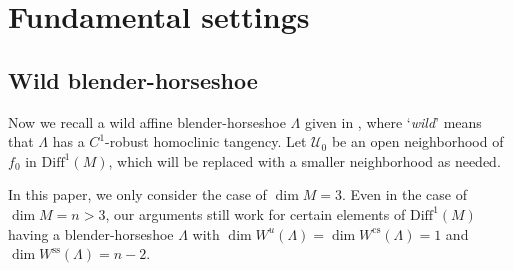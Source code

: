\documentclass{amsart}
\theoremstyle{plain}
\theoremstyle{definition}
\numberwithin{equation}{section}
\numberwithin{figure}{section}
\def\cs{{\mathrm{cs}}}
\def\diff{\mathrm{Diff}}
\begin{document}
\section{Fundamental settings}

\subsection{Wild blender-horseshoe}


Now we recall a wild affine blender-horseshoe $\Lambda$ given in \cite{KNS23,KNS}, 
where `\emph{wild}' means that $\Lambda$ has a $C^1$-robust homoclinic tangency.
Let $\mathcal{U}_0$ be an open neighborhood of $f_0$ in $\diff^1(M)$, which 
will be replaced with a smaller neighborhood as needed.

In this paper, we only consider the case of $\dim M=3$.
Even in the case of $\dim M=n>3$, our arguments still work for certain elements of 
$\diff^1(M)$ having a blender-horseshoe $\Lambda$ with $\dim W^u(\Lambda)=\dim W^{\cs}(\Lambda)=1$ and $\dim W^{\mathrm{ss}}(\Lambda)=n-2$.
\end{document}
